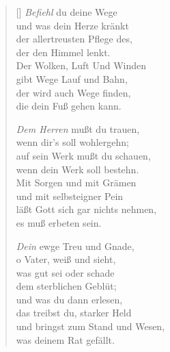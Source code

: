 


\begin{multicols}{2}
\settowidth{\versewidth}{Befiehl du deine Wege und was}                                                  
\begin{verse}[\versewidth]                                                                                              
   \emph{Befiehl} du deine Wege\\
  und was dein Herze kränkt\\
  der allertreusten Pflege des,\\
  der den Himmel lenkt.\\
  Der Wolken, Luft Und Winden\\
  gibt Wege Lauf und Bahn,\\
  der wird auch Wege finden,\\
  die dein Fuß gehen kann.
  
   \emph{Dem Herren} mußt du trauen,\\
  wenn dir's soll wohlergehn;\\
  auf sein Werk mußt du schauen,\\
  wenn dein Werk soll bestehn.\\
  Mit Sorgen und mit Grämen\\
  und mit selbsteigner Pein\\
  läßt Gott sich gar nichts nehmen,\\
  es muß erbeten sein.

  
   \emph{Dein} ewge Treu und Gnade,\\
  o Vater,  weiß und sieht,\\
  was gut sei oder schade\\
  dem sterblichen Geblüt;\\
  und was du dann erlesen,\\
  das treibst du, starker Held\\
  und bringst zum Stand und Wesen,\\
  was deinem Rat gefällt.
  

\end{verse}
\end{multicols}
